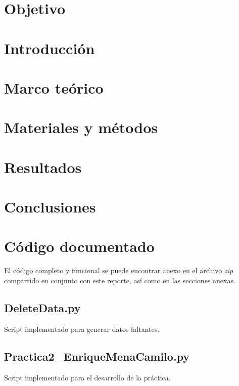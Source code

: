 \documentclass[12pt, letterpaper, spanish, twoside]{article}
\begin{document}
\lstset{inputencoding=utf8/latin1}
\renewcommand{\tablename}{Tabla}




\tableofcontents
\newpage


\section{Objetivo}


\section{Introducción}


\section{Marco teórico}


\section{Materiales y métodos}


% 

\section{Resultados}


\section{Conclusiones}


\renewcommand{\refname}{Referencias bibliográficas}



\appendix
\section{Código documentado}
El código completo y funcional se puede encontrar anexo en el archivo \emph{zip} compartido en conjunto con este reporte, así como en las secciones anexas.

\subsection{DeleteData.py}
Script implementado para generar datos faltantes.


\subsection{Practica2\_EnriqueMenaCamilo.py}
Script implementado para el desarrollo de la práctica.

\end{document}
